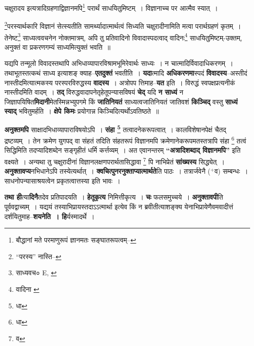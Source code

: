 \documentclass[article,12pt,a4paper]{memoir}
\newcommand{\add}[1]{($^{+}$#1)}
\begin{document}
	  \pstart चक्षुरादय इत्यत्रादिग्रहणाद्विज्ञानमपि\footnote{बौद्धानां मते परमाणुरूपं ज्ञानमतः सङ्घातरूपत्वम्--\cite{dp-msD-n}} परार्थं साधयितुमिष्टम् । विज्ञानाच्च पर आत्मैव स्यात् ।
	\pend
       

	  \pstart \footnote{“परस्य” नास्ति--\cite{dp-msB}}\-परस्यार्थकारि विज्ञानं सेत्स्यतीति सामर्थ्यादात्मार्थत्वं सिध्यति चक्षुरादीनामिति मत्वा परार्थग्रहणं कृतम् । तेनेष्ट\footnote{साध्यवच० \cite{dp-msA} \cite{dp-msB} \cite{dp-edP} \cite{dp-edH} E, \cite{dp-edN}} साध्यत्ववचनेन नोक्तमात्रम्, अपि तु प्रतिवादिनो विवादास्पदत्वाद् वादिनः\footnote{वादिना \cite{dp-edE}} साधयितुमिष्टम्-उक्तम्, अनुक्तं वा प्रकरणगम्यं साध्यमित्युक्तं भवति ॥
	\pend
      
	  \endgroup
	

	  \pstart यद्यपि तन्मूलो विवादस्तथापि अभिधाव्यापारविश्रामभूमिरेवार्थः साध्यः । न चात्मादिर्विवादाधिकरणम् । तथाभूतस्तत्कथं साध्य इत्याशङ् क्याह--\textbf{एतदुक्तं} भवतीति । \textbf{यदा}त्मादि \textbf{अधिकरणमा}स्पदं \textbf{विवादस्य}--अस्तीदं नास्तीदमित्यात्मकस्य परस्परविरुद्धस्य \textbf{वादस्य} । अत्रोपप\leavevmode{} त्तिमाह--\textbf{यत} इति । विरुद्धं स्वपक्षप्रत्यनीकं नास्तीदमिति वादम् । \textbf{तद्} विरुद्धवादापनेतृहेतूपन्यासविषयं \textbf{चेद्} यदि \textbf{न साध्यं} न जिज्ञापयिषित\textbf{मिदानी}मेतस्मिन्नभ्युपगमे किं \textbf{जातिनियतं} साध्यत्वजातिनियतं जातिवशं \textbf{किञ्चिद्} वस्तु \textbf{साध्यं स्याद्} भवितुमर्हति । \textbf{क्षेपे किमः} प्रयोगान्न किञ्चिदित्यर्थोऽवतिष्ठते ॥
	\pend
      

	  \pstart \textbf{अनुक्तमपि} साक्षादभिधाव्यापाराविषयोऽपि । \textbf{संहा \footnote{धा}} तत्वादनेकरूपत्वात् । कालविशेषानपेक्षं चैतद् द्रष्टव्यम् । तेन क्रमेण युगपद् वा संहतं तदिति संहतरूपं विज्ञानमपि क्रमेणानेकरूपमतस्तत्रापि संहा \footnote{धा} तत्वं सिद्धिमिति तदप्यादिशब्देन सङ्गृहीतं धर्मि कर्त्तव्यम् । अत एवानन्तरम् \textbf{“अत्रादिशब्दाद् विज्ञानमपि”} इति वक्ष्यते । अन्यथा तु चक्षुरादीनां विज्ञानलक्षणपरार्थतासिद्धावा \footnote{व} पि नाभिप्रेतं \textbf{सांख्यस्य} सिद्ध्येत् । \textbf{अनुक्तावप्य}नभिधानेऽपि तस्येत्यर्थात् । \textbf{क्वचित्पुनरनुक्ताप्यात्मार्थते}ति पाठः । तत्रार्जवेनै \add{व} सम्बन्धः । साधनोपन्यासाश्रयत्वेन प्रकृतत्वात्तस्या इति भावः ।
	\pend
      

	  \pstart \textbf{तथा ही}त्या\textbf{दिनै}तदेव प्रतिपादयति । \textbf{हेतूकृत्य} निमित्तीकृत्य । \textbf{चः} फलसमुच्चये । \textbf{अनुक्तावपी}ति पूर्ववद्वाच्यम् । यद्ययं तस्याभिप्रायस्तदाऽऽत्मार्था इत्येव किं न ब्रवीतीत्याशङ्क्य येनाभिप्रायेणैवमवादीत्तं दर्शयितुमाह--\textbf{शयनेति । हि}र्यस्मादर्थे ।
	\pend
	  \bigskip
	  \begingroup
	
\end{document}
